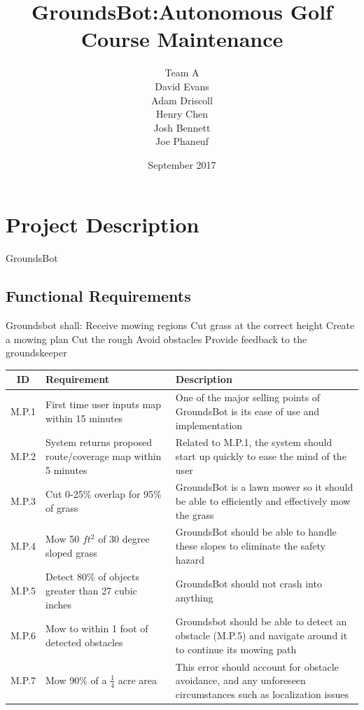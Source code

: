 \documentclass{article}
\begin{document}


\title{GroundsBot:Autonomous Golf Course Maintenance}
\date{September 2017}
\author{Team A        \\ David Evans \\
        Adam Driscoll \\ Henry Chen  \\
        Josh Bennett  \\ Joe Phaneuf \\ }
\maketitle
\newpage

\tableofcontents
\newpage

\section{Project Description}
GroundsBot \\
\subsection{Functional Requirements}
Groundsbot shall:
  Receive mowing regions
  Cut grass at the correct height
  Create a mowing plan
  Cut the rough 
  Avoid obstacles
  Provide feedback to the groundskeeper
\begin{center}
\begin{tabularx}{\textwidth}{ |c|X|X| }
  \hline
    ID & Requirement & Description \\
  \hline
    M.P.1 &
    First time user inputs map within 15 minutes &
    One of the major selling points of GroundsBot is its ease of use and implementation \\
  \hline
    M.P.2 &
    System returns proposed route/coverage map within 5 minutes &
    Related to M.P.1, the system should start up quickly to ease the mind of the user \\
  \hline
    M.P.3 &
    Cut 0-25\% overlap for 95\% of grass &
    GroundsBot is a lawn mower so it should be able to efficiently and effectively mow the grass \\
  \hline
  	M.P.4 &
  	Mow 50 $ft^2$ of 30 degree sloped grass &
  	GroundsBot should be able to handle these slopes to eliminate the safety hazard \\
  \hline
  	M.P.5 &
  	Detect 80\% of objects greater than 27 cubic inches &
  	GroundsBot should not crash into anything \\
  \hline
  	M.P.6 &
  	Mow to within 1 foot of detected obstacles &
  	Groundsbot should be able to detect an obstacle (M.P.5) and navigate around it to continue its mowing path \\
  \hline
  	M.P.7 &
  	Mow 90\% of a $\frac{1}{4}$ acre area &
  	This error should account for obstacle avoidance, and any unforeseen circumstances such as localization issues \\
  \hline
\end{tabularx}
\end{center}
\end{document}
